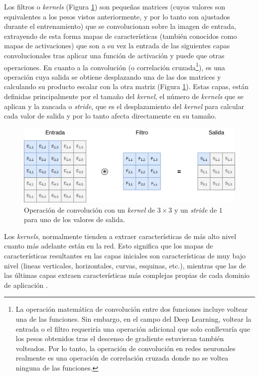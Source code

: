 Los filtros o \textit{kernels} (Figura \ref{fig:convolucion}) son pequeñas matrices (cuyos valores son equivalentes a los pesos vistos anteriormente, y por lo tanto son ajustados durante el entrenamiento) que se convolucionan sobre la imagen de entrada, extrayendo de esta forma mapas de características (también conocidos como mapas de activaciones) que son a su vez la entrada de las siguientes capas convolucionales tras aplicar una función de activación y puede que otras operaciones. En cuanto a la convolución (o correlación cruzada\footnote{La operación matemática de convolución entre dos funciones incluye voltear una de las funciones. Sin embargo, en el campo del Deep Learning, voltear la entrada o el filtro requeriría una operación adicional que solo conllevaría que los pesos obtenidos tras el descenso de gradiente estuvieran también volteados. Por lo tanto, la operación de convolución en redes neuronales realmente es una operación de correlación cruzada donde no se voltea ninguna de las funciones.}), es una operación cuya salida se obtiene desplazando una de las dos matrices y calculando su producto escalar con la otra matriz (Figura \ref{fig:convolucion}). Estas capas, están definidas principalmente por el tamaño del \textit{kernel}, el número de \textit{kernels} que se aplican y la zancada o \textit{stride}, que es el desplazamiento del \textit{kernel} para calcular cada valor de salida y por lo tanto afecta directamente en su tamaño. 

\begin{figure}[H]
\centering
\includegraphics[width=0.8\linewidth]{imagenes/convolucion.png} 
\captionsetup{width=.8\linewidth}
\caption{Operación de convolución con un \textit{kernel} de $3\times3$ y un \textit{stride} de $1$ para uno de los valores de salida.}
\label{fig:convolucion}
\end{figure}

Los \textit{kernels}, normalmente tienden a extraer características de más alto nivel cuanto más adelante están en la red. Esto significa que los mapas de características resultantes en las capas iniciales son características de muy bajo nivel (lineas verticales, horizontales, curvas, esquinas, etc.), mientras que las de las últimas capas extraen características más complejas propias de cada dominio de aplicación \cite{zeiler2014visualizing}.

